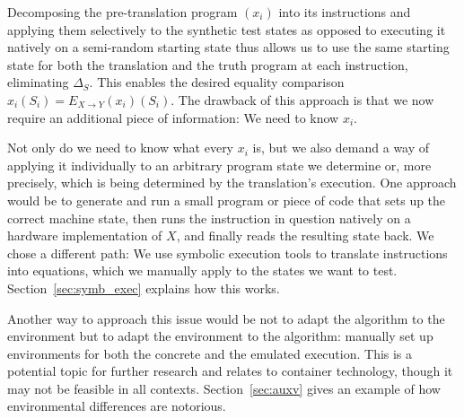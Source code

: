 Decomposing the pre-translation program $(x_i)$ into its instructions and applying them selectively to the synthetic
test states as opposed to executing it natively on a semi-random starting state thus allows us to use the same starting
state for both the translation and the truth program at each instruction, eliminating $\Delta_S$. This enables the
desired equality comparison $x_i(S_i) = E_{X \rightarrow Y}(x_i)(S_i)$. The drawback of this approach is that we now
require an additional piece of information: We need to know $x_i$.

Not only do we need to know what every $x_i$ is, but we also demand a way of applying it individually to an arbitrary
program state we determine or, more precisely, which is being determined by the translation's execution. One approach
would be to generate and run a small program or piece of code that sets up the correct machine state, then runs the
instruction in question natively on a hardware implementation of $X$, and finally reads the resulting state back. We
chose a different path: We use symbolic execution tools to translate instructions into equations, which we manually
apply to the states we want to test. Section~\ref{sec:symb_exec} explains how this works.

Another way to approach this issue would be not to adapt the algorithm to the environment but to adapt the environment
to the algorithm: manually set up environments for both the concrete and the emulated execution. This is a potential
topic for further research and relates to container technology, though it may not be feasible in all contexts.
Section~\ref{sec:auxv} gives an example of how environmental differences are notorious.


